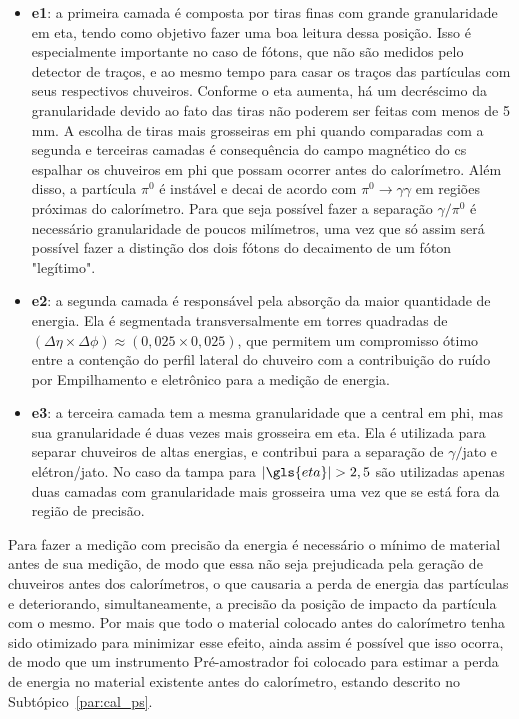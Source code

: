 \begin{itemize}
\item \textbf{\gls{e1}}: a primeira camada é composta por tiras
finas com grande granularidade em \gls{eta}, tendo como objetivo fazer uma
boa leitura dessa posição. Isso é especialmente importante no caso de fótons,
que não são medidos pelo detector de traços, e ao mesmo tempo para casar os
traços das partículas com seus respectivos chuveiros. Conforme o \gls{eta} aumenta,
há um decréscimo da granularidade devido ao fato das tiras não poderem ser feitas com menos de 5 mm.
A escolha de tiras mais grosseiras em \gls{phi} quando comparadas com a segunda e 
terceiras camadas é consequência do campo magnético do \gls{cs} espalhar os
chuveiros em \gls{phi} que possam ocorrer antes do calorímetro.
Além disso, a partícula $\pi^0$ é instável e decai de acordo com
$\pi^0\rightarrow\gamma\gamma$ em regiões próximas do calorímetro. Para que seja
possível fazer a separação $\gamma/\pi^0$ é necessário granularidade de
poucos milímetros, uma vez que só assim será possível fazer a distinção dos dois
fótons do decaimento de um fóton "legítimo". 
\item \textbf{\gls{e2}}: a segunda camada é responsável pela
absorção da maior quantidade de energia. Ela é segmentada transversalmente em
torres quadradas de $(\Delta\eta\times\Delta\phi)\approx(0,025\times0,025)$, que
permitem um compromisso ótimo entre a contenção do perfil lateral do chuveiro
com a contribuição do ruído por Empilhamento e eletrônico para a medição de
energia.
\item \textbf{\gls{e3}}: a terceira camada tem a mesma
granularidade que a central em \gls{phi}, mas sua granularidade é duas vezes mais grosseira
em \gls{eta}. Ela é utilizada para separar chuveiros de altas energias, e
contribui para a separação de $\gamma/$jato e elétron/jato. No caso da tampa
para $|\gls{eta}|>2,5$ são utilizadas apenas duas camadas com granularidade mais
grosseira uma vez que se está fora da região de precisão.
\end{itemize}

Para fazer a medição com precisão da energia é necessário o mínimo de material 
antes de sua medição, de modo que essa não seja prejudicada pela geração de
chuveiros antes dos calorímetros, o que causaria a perda de energia das
partículas e deteriorando, simultaneamente, a precisão da posição de impacto 
da partícula com o mesmo. Por mais que todo o material colocado antes do
calorímetro tenha sido otimizado para minimizar esse efeito, ainda assim é
possível que isso ocorra, de modo que um instrumento Pré-amostrador foi colocado 
para estimar a perda de energia no material existente antes do calorímetro, 
estando descrito no Subtópico~\ref{par:cal_ps}.


